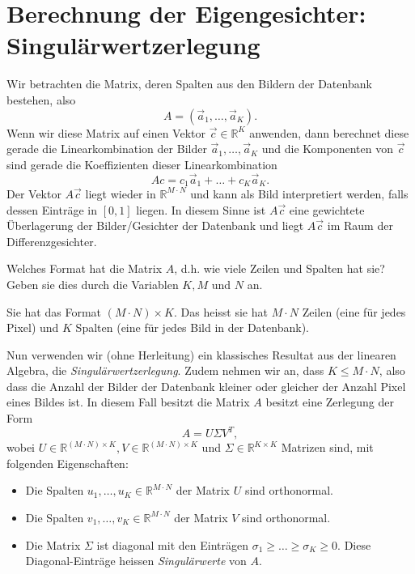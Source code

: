 \section{Berechnung der Eigengesichter: Singulärwertzerlegung}
Wir betrachten die Matrix, deren Spalten aus den Bildern der Datenbank bestehen, also
\begin{equation*}
	A=\left(\vec a_1,\ldots,\vec a_K\right).
\end{equation*}
Wenn wir diese Matrix auf einen Vektor $\vec c\in\mathbb R^K$ anwenden, dann berechnet diese gerade die Linearkombination der Bilder $\vec a_1,\ldots,\vec a_K$ und die Komponenten von $\vec c$ sind gerade die Koeffizienten dieser Linearkombination
\begin{equation*}
	Ac=c_1\vec a_1+\ldots+c_K\vec a_K.
\end{equation*}
Der Vektor $A\vec c$ liegt wieder in $\mathbb R^{M\cdot N}$ und kann als Bild interpretiert werden, falls dessen Einträge in $\left[0,1\right]$ liegen.
In diesem Sinne ist $A\vec c$ eine gewichtete Überlagerung der Bilder/Gesichter der Datenbank und liegt $A\vec c$ im Raum der Differenzgesichter.
\begin{aufgabe}
	Welches Format hat die Matrix $A$, d.h. wie viele Zeilen und Spalten hat sie?
	Geben sie dies durch die Variablen $K,M$ und $N$ an. 
\end{aufgabe}
\begin{losung}
	Sie hat das Format $\left(M\cdot N\right)\times K$.
	Das heisst sie hat $M\cdot N$ Zeilen (eine für jedes Pixel) und $K$ Spalten (eine für jedes Bild in der Datenbank).
\end{losung}
Nun verwenden wir (ohne Herleitung) ein klassisches Resultat aus der linearen Algebra, die \textit{Singulärwertzerlegung}.
Zudem nehmen wir an, dass $K\leq M\cdot N$, also dass die Anzahl der Bilder der Datenbank kleiner oder gleicher der Anzahl Pixel eines Bildes ist.
In diesem Fall besitzt die Matrix $A$ besitzt eine Zerlegung der Form
\begin{equation*}
	A=U\Sigma V^T,
\end{equation*}
wobei $U\in\mathbb R^{\left(M\cdot N\right)\times K},V\in\mathbb R^{\left(M\cdot N\right)\times K}$ und $\Sigma\in\mathbb R^{K\times K}$ Matrizen sind, mit folgenden Eigenschaften:
\begin{itemize}
	\item Die Spalten $u_1,\ldots,u_K\in\mathbb R^{M\cdot N}$ der Matrix $U$ sind orthonormal.
	\item Die Spalten $v_1,\ldots,v_K\in\mathbb R^{M\cdot N}$ der Matrix $V$ sind orthonormal.
	\item Die Matrix $\Sigma$ ist diagonal mit den Einträgen $\sigma_1\geq\ldots\geq\sigma_K\geq 0$.
	Diese Diagonal-Einträge heissen \textit{Singulärwerte} von $A$.
\end{itemize}
